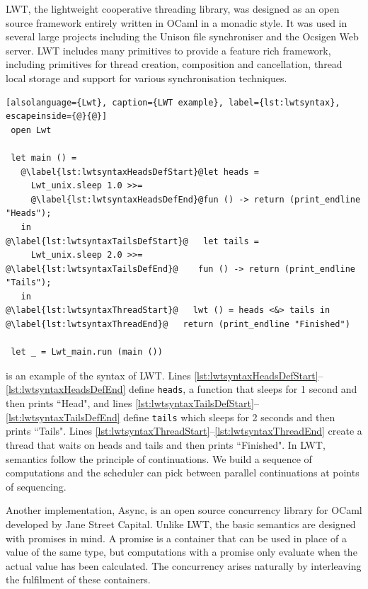 \documentclass[12pt,twoside,notitlepage]{report}
\theoremstyle{plain}%
\theoremstyle{definition}
\theoremstyle{remark}
\begin{document}
LWT, the lightweight cooperative threading library\cite{vouillon2008lwt}, was designed as an open source framework entirely written in OCaml in a monadic style. It was used in several large projects including the Unison file synchroniser and the Ocsigen Web server. LWT includes many primitives to provide a feature rich framework, including primitives for thread creation, composition and cancellation, thread local storage and support for various synchronisation techniques. 


\begin{minipage}{\linewidth}

\begin{lstlisting}[alsolanguage={Lwt}, caption={LWT example}, label={lst:lwtsyntax}, escapeinside={@}{@}]
 open Lwt
 
 let main () =
   @\label{lst:lwtsyntaxHeadsDefStart}@let heads =
     Lwt_unix.sleep 1.0 >>=
     @\label{lst:lwtsyntaxHeadsDefEnd}@fun () -> return (print_endline "Heads");
   in
@\label{lst:lwtsyntaxTailsDefStart}@   let tails =
     Lwt_unix.sleep 2.0 >>=
@\label{lst:lwtsyntaxTailsDefEnd}@    fun () -> return (print_endline "Tails");
   in
@\label{lst:lwtsyntaxThreadStart}@   lwt () = heads <&> tails in
@\label{lst:lwtsyntaxThreadEnd}@   return (print_endline "Finished")
 
 let _ = Lwt_main.run (main ())
\end{lstlisting}

\end{minipage}



 is an example of the syntax of LWT. Lines \ref{lst:lwtsyntaxHeadsDefStart}--\ref{lst:lwtsyntaxHeadsDefEnd} define \verb|heads|, a function that sleeps for 1 second and then prints ``Head", and lines \ref{lst:lwtsyntaxTailsDefStart}--\ref{lst:lwtsyntaxTailsDefEnd} define \verb|tails| which sleeps for 2 seconds and then prints ``Tails".  Lines \ref{lst:lwtsyntaxThreadStart}--\ref{lst:lwtsyntaxThreadEnd} create a thread that waits on heads and tails and then prints ``Finished".  In LWT, semantics follow the principle of continuations. We build a sequence of computations and the scheduler can pick between parallel continuations at points of sequencing.

Another implementation, Async, is an open source concurrency library for OCaml developed by Jane Street Capital. Unlike LWT, the basic semantics are designed with promises in mind. A promise is a container that can be used in place of a value of the same type, but computations with a promise only evaluate when the actual value has been calculated. The concurrency arises naturally by interleaving the fulfilment of these containers. 
\end{document}
